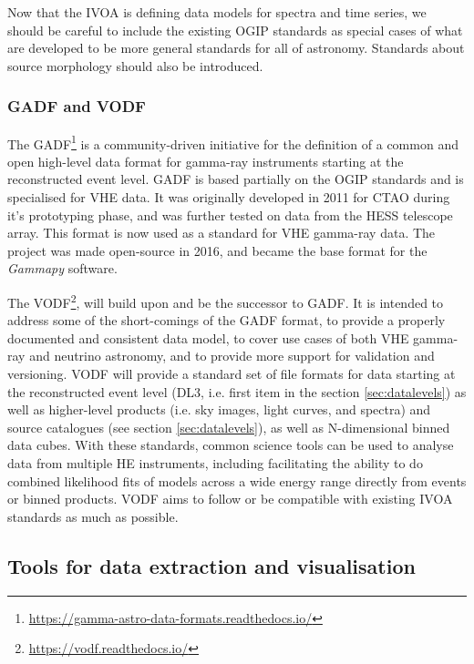 \documentclass[11pt,a4paper]{ivoa}
\begin{document}
{Now that the \gls{IVOA} is defining data models for spectra and time series, we should be careful to include the existing \gls{OGIP}
standards as special cases of what are developed to be more general standards for all of astronomy. Standards about
source morphology should also be introduced.

\subsubsection{GADF and VODF}
\label{sec:GADF}

The \gls{GADF}\footnote{\url{https://gamma-astro-data-formats.readthedocs.io/}} is a community-driven initiative for the definition
of a common and open high-level data format for gamma-ray instruments \citep{2017AIPC.1792g0006D} starting at the
reconstructed event level. \gls{GADF} is based partially on the \gls{OGIP} standards and is specialised for \gls{VHE} data.
It was originally developed in 2011 for \gls{CTAO} during it's prototyping phase, and was further tested on data from the
\gls{HESS} telescope array. This format is now used as a standard for \gls{VHE} gamma-ray data. The project was made open-source
in 2016, and became the base format for the \emph{Gammapy} software.

The \gls{VODF}\footnote{\url{https://vodf.readthedocs.io/}}, will build upon and be the successor to \gls{GADF}. It is
intended to address some of the short-comings of the \gls{GADF} format, to provide a properly documented and consistent data
model, to cover use cases of both \gls{VHE} gamma-ray and neutrino astronomy, and to provide more support for validation and
versioning. \gls{VODF} will provide a standard set of file formats for data starting at the reconstructed event level (DL3, i.e.
first item in the section \ref{sec:datalevels}) as well as higher-level products (i.e. sky images, light curves, and spectra)
and source catalogues (see section \ref{sec:datalevels}), as well as N-dimensional binned data cubes. With these
standards, common science tools can be used to analyse data from multiple \gls{HE} instruments, including
facilitating the ability to do combined likelihood fits of models across a wide energy range directly from events or
binned products. \gls{VODF} aims to follow or be compatible with existing \gls{IVOA} standards as much as possible.

\subsection{Tools for data extraction and visualisation}
\label{sec:tools}

}
\end{document}
